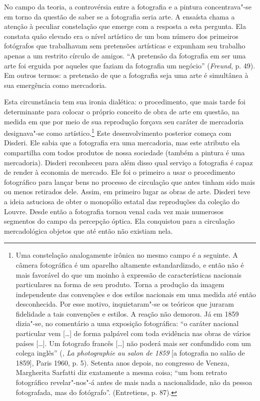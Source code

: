 No campo da teoria, a controvérsia entre a fotografia e a pintura
concentrava"-se em torno da questão de saber se a fotografia seria arte.
A ensaísta chama a atenção à peculiar constelação que emerge com a
resposta a esta pergunta. Ela constata quão elevado era o nível
artístico de um bom número dos primeiros fotógrafos que trabalhavam sem
pretensões artísticas e expunham seu trabalho apenas a um restrito
círculo de amigos. ``A pretensão da fotografia em ser uma arte foi
erguida por aqueles que faziam da fotografia um negócio''
(\emph{Freund}, p. 49). Em outros termos: a pretensão de que a
fotografia seja uma arte é simultânea à sua emergência como mercadoria.

Esta circunstância tem sua ironia dialética: o procedimento, que mais
tarde foi determinante para colocar o próprio conceito de obra de arte
em questão, na medida em que por meio de sua reprodução forçava seu
caráter de mercadoria designava"-se como artístico.\footnote{Uma
  constelação analogamente irônica no mesmo campo é a seguinte. A câmera
  fotográfica é um aparelho altamente estandardizado, e então não é mais
  favorável do que um moinho à expressão de características nacionais
  particulares na forma de seu produto. Torna a produção da imagem
  independente das convenções e dos estilos nacionais em uma medida até
  então desconhecida. Por esse motivo, inquietaram"-se os teóricos que
  juraram fidelidade a tais convenções e estilos. A reação não demorou.
  Já em 1859 dizia"-se, no comentário a uma exposição fotográfica: ``o
  caráter nacional particular vem {[}\ldots{}{]} de forma palpável com toda
  evidência nas obras de vários países {[}\ldots{}{]}. Um fotografo francês
  {[}\ldots{}{]} não poderá mais ser confundido com um colega inglês'' (, \emph{La photographie au salon de 1859} {[}a fotografia no
  salão de 1859{]}, Paris 1960, p. 5). Setenta anos depois, no congresso
  de Veneza, Margherita Sarfatti diz exatamente a mesma coisa; ``um bom
  retrato fotográfico revelar"-nos"-á antes de mais nada a nacionalidade,
  não da pessoa fotografada, mas do fotógrafo''. (Entretiens, p. 87).}
Este desenvolvimento posterior começa com Disderi. Ele sabia que a
fotografia era uma mercadoria, mas este atributo ela compartilha com
todos produtos de nossa sociedade (também a pintura é uma mercadoria).
Disderi reconheceu para além disso qual serviço a fotografia é capaz de
render à economia de mercado. Ele foi o primeiro a usar o procedimento
fotográfico para lançar bens no processo de circulação que antes tinham
sido mais ou menos retirados dele. Assim, em primeiro lugar as obras de
arte. Disderi teve a ideia astuciosa de obter o monopólio estatal das
reproduções da coleção do Louvre. Desde então a fotografia tornou venal
cada vez mais numerosos segmentos do campo da percepção óptica. Ela
conquistou para a circulação mercadológica objetos que até então não
existiam nela.

